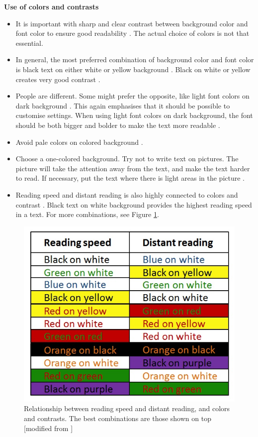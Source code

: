 \textbf{Use of colors and contrasts}
\begin{itemize} 
\item It is important with sharp and clear contrast between background color and font color to ensure good readability \cite{blindeforbundetTekst} \cite{actionforblindpeopleTekst}. The actual choice of colors is not that essential.   
\item In general, the most preferred combination of background color and font color is black text on either white or yellow background \cite{actionforblindpeopleTekst}. Black on white or yellow creates very good contrast \cite{blindeforbundetTekst}. 
\item People are different. Some might prefer the opposite, like light font colors on dark background \cite{blindeforbundetTekst}. This again emphasises that it should be possible to customise settings. When using light font colors on dark background, the font should be both bigger and bolder to make the text more readable \cite{actionforblindpeopleTekst}.
\item Avoid pale colors on colored background \cite{blindeforbundetTekst}.  
\item Choose a one-colored background. Try not to write text on pictures. The picture will take the attention away from the text, and make the text harder to read. If necessary, put the text where there is light areas in the picture  \cite{blindeforbundetTekst}.  
\item Reading speed and distant reading is also highly connected to colors and contrast  \cite{blindeforbundetTekst}. Black text on white background provides the highest reading speed in a text. For more combinations, see Figure \ref{fig:colors}.
\end{itemize}

\begin{figure} [ht!]
\centering
\includegraphics[scale=0.8]{readingcolors.jpg}
\caption[Colors and contrasts]{Relationship between reading speed and distant reading, and colors and contrasts. The best combinations are those shown on top [modified from \cite{blindeforbundetTekst}]}
\label{fig:colors}
\end{figure}

